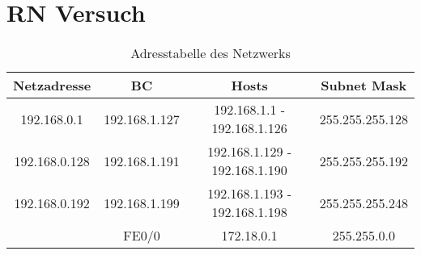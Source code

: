 
\chapter{RN Versuch}

\begin{table}
\begin{tabular}{|*{4}{c|}}
\hline
Netzadresse & BC & Hosts & Subnet Mask \\
\hline
\hline
192.168.0.1 & 192.168.1.127 & 192.168.1.1 - 192.168.1.126 & 255.255.255.128 \\
\hline
 192.168.0.128 & 192.168.1.191 & 192.168.1.129 - 192.168.1.190 & 255.255.255.192 \\
\hline
192.168.0.192 & 192.168.1.199 & 192.168.1.193 - 192.168.1.198 & 255.255.255.248 \\

\hline
  &  FE0/0 & 172.18.0.1 &  255.255.0.0\\
\hline
\end{tabular}
\caption{Adresstabelle des Netzwerks}
\label{adresstabelle}
\end{table}


